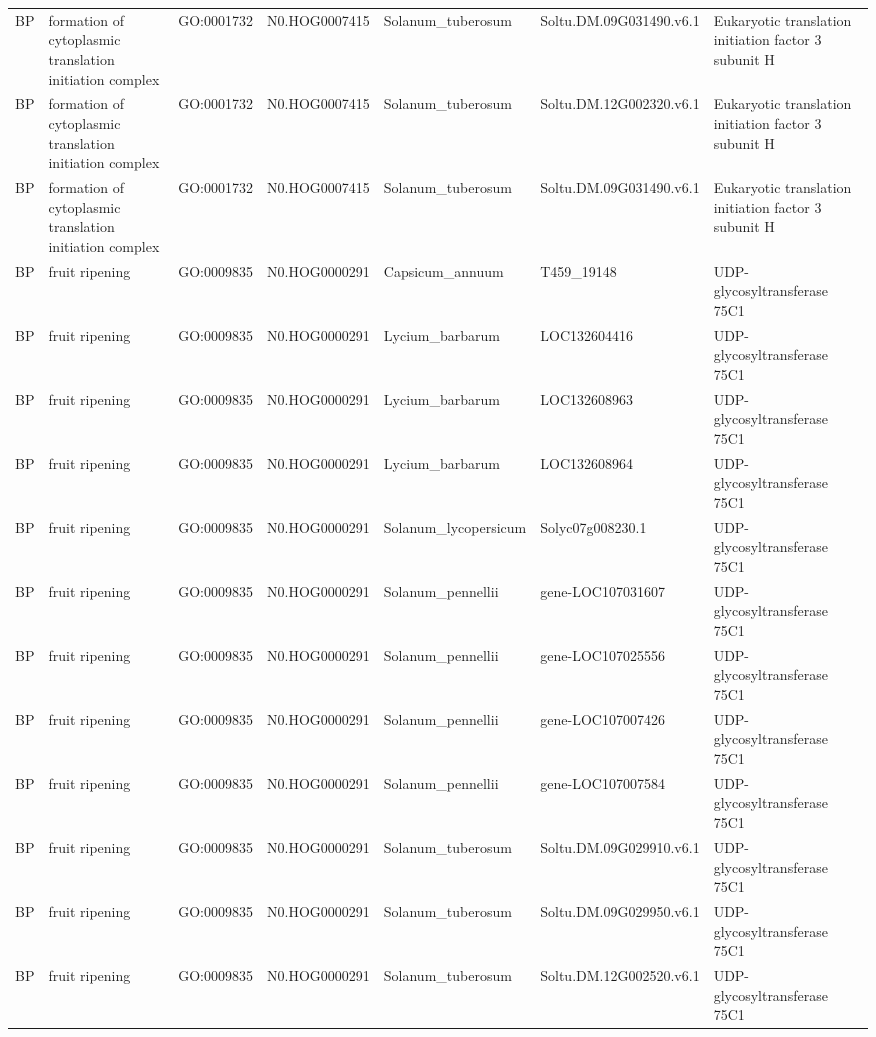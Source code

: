 \begin{table}
\begin{tabular}[t]{lllllll}
BP & formation of cytoplasmic translation initiation complex & GO:0001732 & N0.HOG0007415 & Solanum\_tuberosum & Soltu.DM.09G031490.v6.1 & Eukaryotic translation initiation factor 3 subunit H\\
BP & formation of cytoplasmic translation initiation complex & GO:0001732 & N0.HOG0007415 & Solanum\_tuberosum & Soltu.DM.12G002320.v6.1 & Eukaryotic translation initiation factor 3 subunit H\\
BP & formation of cytoplasmic translation initiation complex & GO:0001732 & N0.HOG0007415 & Solanum\_tuberosum & Soltu.DM.09G031490.v6.1 & Eukaryotic translation initiation factor 3 subunit H\\
BP & fruit ripening & GO:0009835 & N0.HOG0000291 & Capsicum\_annuum & T459\_19148 & UDP-glycosyltransferase 75C1\\
BP & fruit ripening & GO:0009835 & N0.HOG0000291 & Lycium\_barbarum & LOC132604416 & UDP-glycosyltransferase 75C1\\
BP & fruit ripening & GO:0009835 & N0.HOG0000291 & Lycium\_barbarum & LOC132608963 & UDP-glycosyltransferase 75C1\\
BP & fruit ripening & GO:0009835 & N0.HOG0000291 & Lycium\_barbarum & LOC132608964 & UDP-glycosyltransferase 75C1\\
BP & fruit ripening & GO:0009835 & N0.HOG0000291 & Solanum\_lycopersicum & Solyc07g008230.1 & UDP-glycosyltransferase 75C1\\
BP & fruit ripening & GO:0009835 & N0.HOG0000291 & Solanum\_pennellii & gene-LOC107031607 & UDP-glycosyltransferase 75C1\\
BP & fruit ripening & GO:0009835 & N0.HOG0000291 & Solanum\_pennellii & gene-LOC107025556 & UDP-glycosyltransferase 75C1\\
BP & fruit ripening & GO:0009835 & N0.HOG0000291 & Solanum\_pennellii & gene-LOC107007426 & UDP-glycosyltransferase 75C1\\
BP & fruit ripening & GO:0009835 & N0.HOG0000291 & Solanum\_pennellii & gene-LOC107007584 & UDP-glycosyltransferase 75C1\\
BP & fruit ripening & GO:0009835 & N0.HOG0000291 & Solanum\_tuberosum & Soltu.DM.09G029910.v6.1 & UDP-glycosyltransferase 75C1\\
BP & fruit ripening & GO:0009835 & N0.HOG0000291 & Solanum\_tuberosum & Soltu.DM.09G029950.v6.1 & UDP-glycosyltransferase 75C1\\
BP & fruit ripening & GO:0009835 & N0.HOG0000291 & Solanum\_tuberosum & Soltu.DM.12G002520.v6.1 & UDP-glycosyltransferase 75C1\\

\end{tabular}
\end{table}
